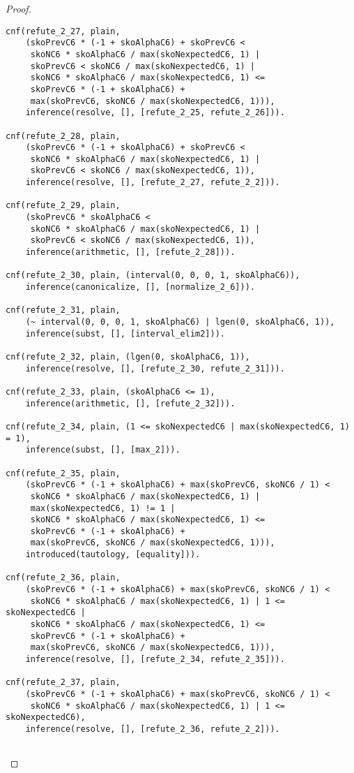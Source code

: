\begin{proof}
\begin{verbatim}
cnf(refute_2_27, plain,
    (skoPrevC6 * (-1 + skoAlphaC6) + skoPrevC6 <
     skoNC6 * skoAlphaC6 / max(skoNexpectedC6, 1) |
     skoPrevC6 < skoNC6 / max(skoNexpectedC6, 1) |
     skoNC6 * skoAlphaC6 / max(skoNexpectedC6, 1) <=
     skoPrevC6 * (-1 + skoAlphaC6) +
     max(skoPrevC6, skoNC6 / max(skoNexpectedC6, 1))),
    inference(resolve, [], [refute_2_25, refute_2_26])).

cnf(refute_2_28, plain,
    (skoPrevC6 * (-1 + skoAlphaC6) + skoPrevC6 <
     skoNC6 * skoAlphaC6 / max(skoNexpectedC6, 1) |
     skoPrevC6 < skoNC6 / max(skoNexpectedC6, 1)),
    inference(resolve, [], [refute_2_27, refute_2_2])).

cnf(refute_2_29, plain,
    (skoPrevC6 * skoAlphaC6 <
     skoNC6 * skoAlphaC6 / max(skoNexpectedC6, 1) |
     skoPrevC6 < skoNC6 / max(skoNexpectedC6, 1)),
    inference(arithmetic, [], [refute_2_28])).

cnf(refute_2_30, plain, (interval(0, 0, 0, 1, skoAlphaC6)),
    inference(canonicalize, [], [normalize_2_6])).

cnf(refute_2_31, plain,
    (~ interval(0, 0, 0, 1, skoAlphaC6) | lgen(0, skoAlphaC6, 1)),
    inference(subst, [], [interval_elim2])).

cnf(refute_2_32, plain, (lgen(0, skoAlphaC6, 1)),
    inference(resolve, [], [refute_2_30, refute_2_31])).

cnf(refute_2_33, plain, (skoAlphaC6 <= 1),
    inference(arithmetic, [], [refute_2_32])).

cnf(refute_2_34, plain, (1 <= skoNexpectedC6 | max(skoNexpectedC6, 1) = 1),
    inference(subst, [], [max_2])).

cnf(refute_2_35, plain,
    (skoPrevC6 * (-1 + skoAlphaC6) + max(skoPrevC6, skoNC6 / 1) <
     skoNC6 * skoAlphaC6 / max(skoNexpectedC6, 1) |
     max(skoNexpectedC6, 1) != 1 |
     skoNC6 * skoAlphaC6 / max(skoNexpectedC6, 1) <=
     skoPrevC6 * (-1 + skoAlphaC6) +
     max(skoPrevC6, skoNC6 / max(skoNexpectedC6, 1))),
    introduced(tautology, [equality])).

cnf(refute_2_36, plain,
    (skoPrevC6 * (-1 + skoAlphaC6) + max(skoPrevC6, skoNC6 / 1) <
     skoNC6 * skoAlphaC6 / max(skoNexpectedC6, 1) | 1 <= skoNexpectedC6 |
     skoNC6 * skoAlphaC6 / max(skoNexpectedC6, 1) <=
     skoPrevC6 * (-1 + skoAlphaC6) +
     max(skoPrevC6, skoNC6 / max(skoNexpectedC6, 1))),
    inference(resolve, [], [refute_2_34, refute_2_35])).

cnf(refute_2_37, plain,
    (skoPrevC6 * (-1 + skoAlphaC6) + max(skoPrevC6, skoNC6 / 1) <
     skoNC6 * skoAlphaC6 / max(skoNexpectedC6, 1) | 1 <= skoNexpectedC6),
    inference(resolve, [], [refute_2_36, refute_2_2])).


\end{verbatim}
\end{proof}
